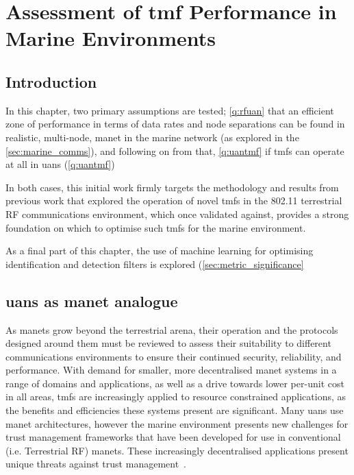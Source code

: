 
\chapter{Assessment of \gls{tmf} Performance in Marine Environments}
\label{ch:comms_trust}

\section{Introduction}

In this chapter, two primary assumptions are tested; \autoref{q:rfuan} that an efficient zone of performance in terms of data rates and node separations can be found in realistic, multi-node, \gls{manet} in the marine network (as explored in the \autoref{sec:marine_comms}), and following on from that, \autoref{q:uantmf} if \glspl{tmf} can operate at all in \glspl{uan} (\autoref{q:uantmf})

In both cases, this initial work firmly targets the methodology and results from previous work that explored the operation of novel \glspl{tmf} in the 802.11 terrestrial RF communications environment\cite{Guo11}, which once validated against, provides a strong foundation on which to optimise such \glspl{tmf} for the marine environment.

As a final part of this chapter, the use of machine learning for optimising identification and detection filters is explored (\autoref{sec:metric_significance}

\section{\glspl{uan} as \gls{manet} analogue}


As \glspl{manet} grow beyond the terrestrial arena, their operation and the protocols designed around them must be reviewed to assess their suitability to different communications environments to ensure their continued security, reliability, and performance.
With demand for smaller, more decentralised \gls{manet} systems in a range of domains and applications, as well as a drive towards lower per-unit cost in all areas, \glspl{tmf} are increasingly applied to resource constrained applications, as the benefits and efficiencies these systems present are significant.
Many \glspl{uan} use \gls{manet} architectures, however the marine environment presents new challenges for trust management frameworks that have been developed for use in conventional (i.e. Terrestrial RF) \glspl{manet}.
These increasingly decentralised applications present unique threats against trust management~\cite{Caiti2011}.

